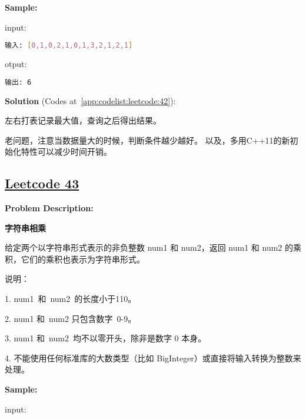 \textbf{Sample:}\par

input:\par

\begin{lstlisting}[language=bash]
输入: [0,1,0,2,1,0,1,3,2,1,2,1]
\end{lstlisting}

otput:\par

\begin{lstlisting}[language=bash]
输出: 6
\end{lstlisting}

\textbf{Solution }(Codes at~\ref{app:codelist:leetcode:42}):\par

左右打表记录最大值，查询之后得出结果。\par

老问题，注意当数据量大的时候，判断条件越少越好。
以及，多用C++11的新初始化特性可以减少时间开销。\par



\subsection{\href{https://leetcode-cn.com/}{Leetcode 43}}\label{app:problemlist:leetcode:43}

\textbf{Problem Description:}\par

\textbf{字符串相乘}\par

给定两个以字符串形式表示的非负整数 num1 和 num2，返回 num1 和 num2 的乘积，它们的乘积也表示为字符串形式。\par

说明：\par

1. num1 和 num2 的长度小于110。\par
2. num1 和 num2 只包含数字 0-9。\par
3. num1 和 num2 均不以零开头，除非是数字 0 本身。\par
4. 不能使用任何标准库的大数类型（比如 BigInteger）或直接将输入转换为整数来处理。\par



\textbf{Sample:}\par

input:\par

